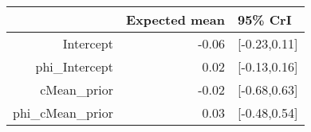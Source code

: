\begin{tabular}{rrl}
  \hline
 & Expected mean & 95\% CrI \\ 
  \hline
Intercept & -0.06 & [-0.23,0.11] \\ 
  phi\_Intercept & 0.02 & [-0.13,0.16] \\ 
  cMean\_prior & -0.02 & [-0.68,0.63] \\ 
  phi\_cMean\_prior & 0.03 & [-0.48,0.54] \\ 
   \hline
\end{tabular}

